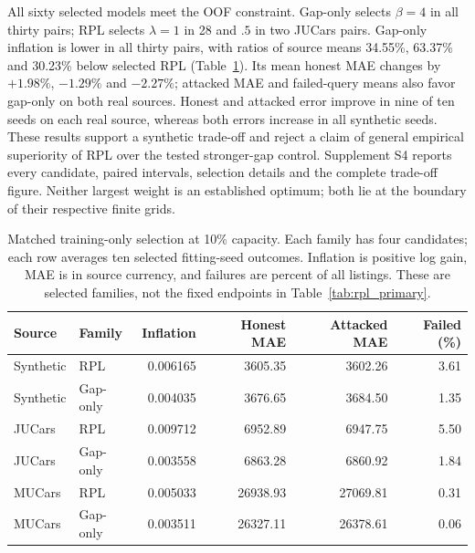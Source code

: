 \documentclass[11pt]{article}
\begin{document}
All sixty selected models meet the OOF constraint. Gap-only selects $\beta=4$
in all thirty pairs; RPL selects $\lambda=1$ in 28 and $.5$ in two JUCars pairs.
Gap-only inflation is lower in all thirty pairs, with ratios of source means
34.55\%, 63.37\% and 30.23\% below selected RPL
(Table~\ref{tab:stronger_gap}). Its mean honest MAE changes by $+1.98\%$,
$-1.29\%$ and $-2.27\%$; attacked MAE and failed-query means also favor
gap-only on both real sources. Honest and attacked error improve in nine of
ten seeds on each real source, whereas both errors increase in all synthetic
seeds. These results support a synthetic trade-off and reject a claim of
general empirical superiority of RPL over the tested stronger-gap control.
Supplement S4 reports every candidate, paired intervals, selection details
and the complete trade-off figure. Neither largest weight is an established
optimum; both lie at the boundary of their respective finite grids.

\begin{table}[htbp]\centering\small
\caption{Matched training-only selection at 10\% capacity. Each family has four candidates; each row averages ten selected fitting-seed outcomes. Inflation is positive log gain, MAE is in source currency, and failures are percent of all listings. These are selected families, not the fixed endpoints in Table~\ref{tab:rpl_primary}.}
\label{tab:stronger_gap}
\begin{tabular}{llrrrr}\toprule
Source & Family & Inflation & Honest MAE & Attacked MAE & Failed (\%)\\\midrule
Synthetic & RPL & 0.006165 & 3605.35 & 3602.26 & 3.61\\
Synthetic & Gap-only & 0.004035 & 3676.65 & 3684.50 & 1.35\\
\midrule
JUCars & RPL & 0.009712 & 6952.89 & 6947.75 & 5.50\\
JUCars & Gap-only & 0.003558 & 6863.28 & 6860.92 & 1.84\\
\midrule
MUCars & RPL & 0.005033 & 26938.93 & 27069.81 & 0.31\\
MUCars & Gap-only & 0.003511 & 26327.11 & 26378.61 & 0.06\\
\bottomrule\end{tabular}\end{table}
\end{document}
